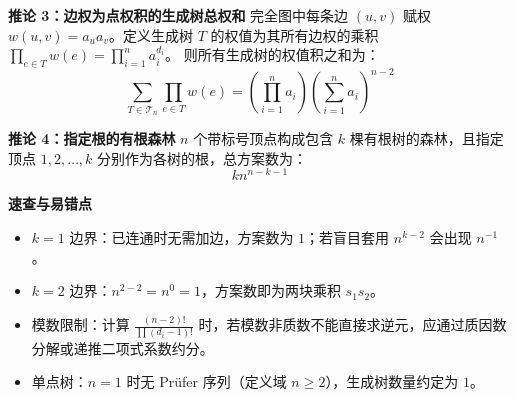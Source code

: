 \textbf{推论 3：边权为点权积的生成树总权和}
完全图中每条边 $(u, v)$ 赋权 $w(u, v) = a_u a_v$。定义生成树 $T$ 的权值为其所有边权的乘积 $\prod_{e\in T} w(e) = \prod_{i=1}^n a_i^{d_i}$。
则所有生成树的权值积之和为：
\[
\sum_{T\in\mathcal{T}_n} \prod_{e\in T} w(e) = \left(\prod_{i=1}^n a_i\right) \left(\sum_{i=1}^n a_i\right)^{n-2}
\]

\textbf{推论 4：指定根的有根森林}
$n$ 个带标号顶点构成包含 $k$ 棵有根树的森林，且指定顶点 $1, 2, \dots, k$ 分别作为各树的根，总方案数为：
\[
k n^{n-k-1}
\]

\textbf{速查与易错点}
\begin{itemize}
    \item $k=1$ 边界：已连通时无需加边，方案数为 $1$；若盲目套用 $n^{k-2}$ 会出现 $n^{-1}$。
    \item $k=2$ 边界：$n^{2-2} = n^0 = 1$，方案数即为两块乘积 $s_1 s_2$。
    \item 模数限制：计算 $\frac{(n-2)!}{\prod (d_i-1)!}$ 时，若模数非质数不能直接求逆元，应通过质因数分解或递推二项式系数约分。
    \item 单点树：$n=1$ 时无 Prüfer 序列（定义域 $n \ge 2$），生成树数量约定为 $1$。
\end{itemize}
